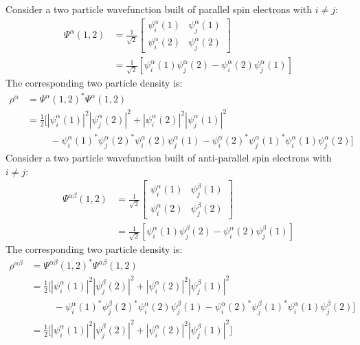 Consider a two particle wavefunction built of parallel spin electrons with $i\neq j$:
\begin{align}
    \Psi^\alpha(1,2)&=\frac{1}{\sqrt{2}} \begin{bmatrix}
    \psi_i^\alpha(1) &
    \psi_j^\alpha(1) \label{zfs:eq:19} \\
    \psi_i^\alpha(2) &
    \psi_j^\alpha(2)
   \end{bmatrix} \\
   &= \frac{1}{\sqrt{2}}\left[ \psi_i^\alpha(1)\psi_j^\alpha(2) - \psi_i^\alpha(2)\psi_j^\alpha(1) \right]
    \label{zfs:eq:20}
\end{align}
The corresponding two particle density is:
\begin{align}
    \rho^{\alpha} &= \Psi^\alpha(1,2)^* \Psi^\alpha(1,2) \label{zfs:eq:21} \\
    &= \frac{1}{2} \bigg[
    |\psi_i^\alpha(1)|^2|\psi_j^\alpha(2)|^2
    + |\psi_i^\alpha(2)|^2|\psi_j^\alpha(1)|^2 \label{zfs:eq:22} \\
    &\hspace{1cm}- \psi_i^\alpha(1)^*\psi_j^\alpha(2)^*\psi_i^\alpha(2)\psi_j^\alpha(1)
                 - \psi_i^\alpha(2)^*\psi_j^\alpha(1)^*\psi_i^\alpha(1)\psi_j^\alpha(2)
    \bigg]
    \nonumber
\end{align}
Consider a two particle wavefunction built of anti-parallel spin electrons with $i\neq j$:
\begin{align}
    \Psi^{\alpha\beta}(1,2)&=\frac{1}{\sqrt{2}} \begin{bmatrix}
    \psi_i^\alpha(1) &
    \psi_j^\beta(1) \\
    \psi_i^\alpha(2) &
    \psi_j^\beta(2)
   \end{bmatrix} \label{zfs:eq:23} \\
   &= \frac{1}{\sqrt{2}}\left[ \psi_i^\alpha(1)\psi_j^\beta(2) - \psi_i^\alpha(2)\psi_j^\beta(1) \right]
    \label{zfs:eq:24}
\end{align}
The corresponding two particle density is:
\begin{align}
    \rho^{\alpha\beta} &= \Psi^{\alpha\beta}(1,2)^* \Psi^{\alpha\beta}(1,2) \label{zfs:eq:25} \\
    &= \frac{1}{2} \bigg[
    |\psi_i^\alpha(1)|^2|\psi_j^\beta(2)|^2
    + |\psi_i^\alpha(2)|^2|\psi_j^\beta(1)|^2 \label{zfs:eq:26} \\
    &\hspace{1cm} - \psi_i^\alpha(1)^*\psi_j^\beta(2)^*\psi_i^\alpha(2)\psi_j^\beta(1)
    - \psi_i^\alpha(2)^*\psi_j^\beta(1)^*\psi_i^\alpha(1)\psi_j^\beta(2)
    \bigg] \nonumber \\
    &=\frac{1}{2} \bigg[
    |\psi_i^\alpha(1)|^2|\psi_j^\beta(2)|^2
    + |\psi_i^\alpha(2)|^2|\psi_j^\beta(1)|^2 \bigg]
    \label{zfs:eq:27}
\end{align}


